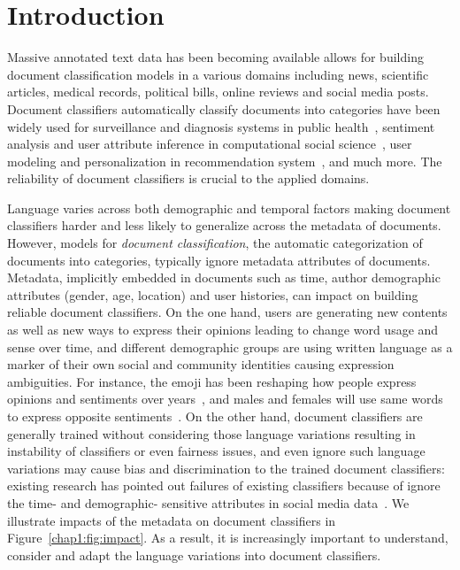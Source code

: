\chapter{Introduction}
\label{chp:intro}
Massive annotated text data has been becoming available allows for building document classification models in a various domains including news, scientific articles, medical records, political bills, online reviews and social media posts.
Document classifiers automatically classify documents into categories have been widely used for surveillance and diagnosis systems in public health~\cite{lamb2013separating, de2016discovering, huang2019can, zhu2019detecting}, sentiment analysis and user attribute inference in computational social science~\cite{rosenthal2011age, yang2016hierarchical, huang2017exploring, heindorf2019debiasing}, user modeling and personalization in recommendation system~\cite{Rao:2010:CLU:1871985.1871993, zhang2014explicit, zheng2014context, he2016ups}, and much more. 
The reliability of document classifiers is crucial to the applied domains.

Language varies across both demographic and temporal factors making document classifiers harder and less likely to generalize across the metadata of documents. 
However, models for \textit{document classification}, the automatic categorization of documents into categories, typically ignore metadata attributes of documents. 
Metadata, implicitly embedded in documents such as time, author demographic attributes (gender, age, location) and user histories, can impact on building reliable document classifiers.
On the one hand, users are generating new contents as well as new ways to express their opinions leading to change word usage and sense over time, and different demographic groups are using written language as a marker of their own social and community identities causing expression ambiguities.
For instance, the emoji has been reshaping how people express opinions and sentiments over years~\cite{felbo2017using}, and males and females will use same words to express opposite sentiments~\cite{volkova2013exploring}. %
On the other hand, document classifiers are generally trained without considering those language variations resulting in instability of classifiers or even fairness issues, and even ignore such language variations may cause bias and discrimination to the trained document classifiers: existing research has pointed out failures of existing classifiers because of ignore the time- and demographic- sensitive attributes in social media data~\cite{gayo2011limits, gayo2013predicting}.
We illustrate impacts of the metadata on document classifiers in Figure~\ref{chap1:fig:impact}.
As a result, it is increasingly important to understand, consider and adapt the language variations into document classifiers.

